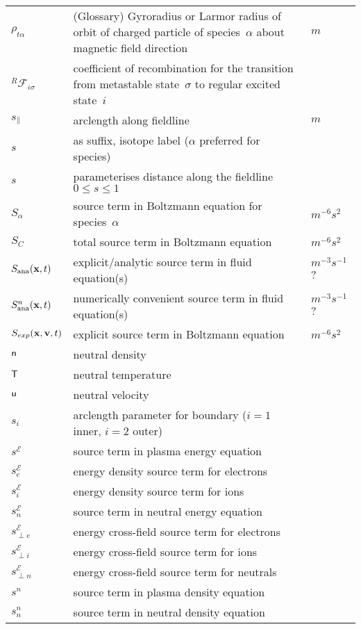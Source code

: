\begin{longtable}{|p{3.0cm}|p{10.0cm}|p{3.0cm}|}
$\rho_{t\alpha}$  & (Glossary) Gyroradius or Larmor radius of orbit of charged particle of species~$\alpha$ about magnetic field direction  & $m$ \\
$^R\mathcal{F}_{i\sigma}$ & coefficient of recombination for the transition from metastable state~$\sigma$ to regular excited state~$i$  & \\
$s_{\|}$ & arclength along fieldline  & $m$ \\
$s$ & as suffix, isotope label ($\alpha$ preferred for species) & \\
$s$ & parameterises distance along the fieldline $0\leq s \leq 1$ & \\
$S_\alpha$ & source term in Boltzmann equation for species~$\alpha$  & $m^{-6} s^2$ \\
$S_C$ & total source term in Boltzmann equation  & $m^{-6} s^2$ \\
$S_\mathrm{ana}({\bf x},t)$ & explicit/analytic source term in fluid equation(s)  & $m^{-3} s^{-1}$ ? \\
$S^n_\mathrm{ana}({\bf x},t)$ & numerically convenient source term in fluid equation(s)  & $m^{-3} s^{-1}$ ? \\
$S_{exp}({\bf x}, {\bf v},t)$ & explicit source term in Boltzmann equation  & $m^{-6} s^2$ \\
${\sf n}$ & neutral density  & \\
${\sf T}$ & neutral temperature  & \\
${\sf u}$ & neutral velocity  & \\
$s_i$ & arclength parameter for boundary ($i=1$ inner, $i=2$ outer) & \\
$s^\mathcal{E}$ & source term in plasma energy equation  &  \\
$s^{\mathcal{E}}_{e}$ & energy density source term for electrons  &  \\
$s^{\mathcal{E}}_{i}$ & energy density source term for ions  &  \\
$s^\mathcal{E}_n$ & source term in neutral energy equation  &  \\
$s^\mathcal{E}_{\perp e}$ & energy cross-field source term for electrons  &  \\
$s^\mathcal{E}_{\perp i}$ & energy cross-field source term for ions   &  \\
$s^\mathcal{E}_{\perp n}$ & energy cross-field source term for neutrals  &  \\
$s^n$ & source term in plasma density equation  &  \\
$s^n_n$ & source term in neutral density equation  &  \\

\end{longtable}
